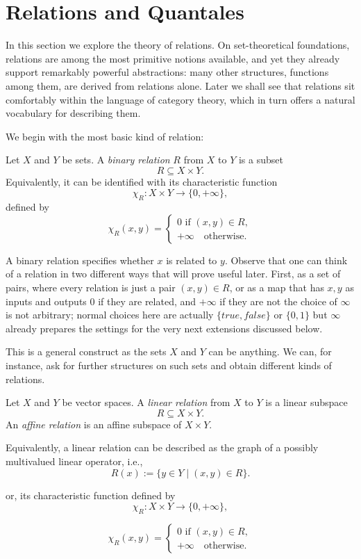 \section{Relations and Quantales}\label{sec:quantale-relations}

In this section we explore the theory of relations.
On set-theoretical foundations, relations are among the most primitive notions
available, and yet they already support remarkably powerful abstractions: many
other structures, functions among them, are derived from relations alone.
Later we shall see that relations sit comfortably within the language of
category theory, which in turn offers a natural vocabulary for describing them.

We begin with the most basic kind of relation:

\begin{definition}\label{def:binary-relations}
	Let $X$ and $Y$ be sets. A \emph{binary relation} $R$ from $X$ to $Y$ is a subset
	\[
		R \subseteq X \times Y.
	\]
	Equivalently, it can be identified with its characteristic function
	\[
		\chi_R : X \times Y \to \{0,+\infty\},
	\]
	defined by
	\[
		\chi_R(x,y) =
		\begin{cases}
			0  \text{ if } (x,y) \in R, \\
			+\infty \quad \text{otherwise}.
		\end{cases}
	\]
\end{definition}

A binary relation specifies whether $x$ is related to $y$.
Observe that one can think of a relation in two different ways that will prove useful later.
First, as a set of pairs, where every relation is just a pair $(x,y) \in R$,
or as a map that has $x,y$ as inputs and outputs 0 if they are related, and $+\infty$ if they are not
the choice of $\infty$ is not arbitrary; normal choices here are actually $\{true,false\}$ or $\{0,1\}$ but $\infty$ already prepares the settings for the very next extensions discussed below.

This is a general construct as the sets $X$ and $Y$ can be anything.
We can, for instance, ask for further structures on such sets and obtain different kinds of relations.
\begin{definition}
	Let $X$ and $Y$ be vector spaces. A \emph{linear relation} from $X$ to $Y$ is a linear subspace
	\[
		R \subseteq X \times Y.
	\]
	An \emph{affine relation} is an affine subspace of $X \times Y$.

	Equivalently, a linear relation can be described as the graph of a possibly multivalued linear operator, i.e.,
	\[
		R(x) := \{ y \in Y \mid (x,y) \in R \}.
	\]

	or, its characteristic function defined by
	\[
		\chi_R : X \times Y \to \{0,+\infty\},
	\]

	\[
		\chi_R(x,y) =
		\begin{cases}
			0  \text{ if } (x,y) \in R, \\
			+\infty \quad \text{otherwise}.
		\end{cases}
	\]

\end{definition}

